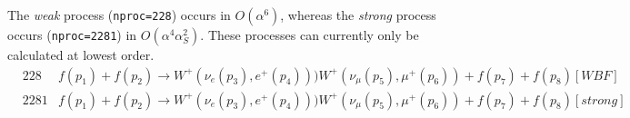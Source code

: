 The {\it weak} process ({\tt nproc=228})  occurs in $O(\alpha^6)$,
whereas the {\it strong} process occurs ({\tt nproc=2281}) in $O(\alpha^4 \alpha_S^2)$.
These processes can currently only be calculated at lowest order.
\begin{eqnarray}
&228  &  f(p_1)+f(p_2) \to W^+(\nu_e(p_3),e^+(p_4)))W^+(\nu_\mu(p_5),\mu^+(p_6))+f(p_7)+f(p_8) [WBF] \nonumber \\
&2281 &  f(p_1)+f(p_2) \to W^+(\nu_e(p_3),e^+(p_4)))W^+(\nu_\mu(p_5),\mu^+(p_6))+f(p_7)+f(p_8) [strong]     \nonumber
\end{eqnarray}
